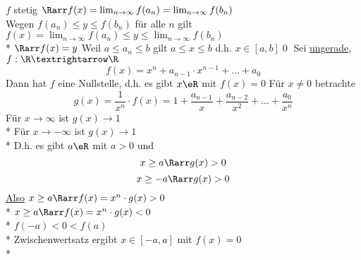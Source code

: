 	$f$ stetig $\Rarr f(x) = \lim_{n \to \infty} f(a_n) = \lim_{n \to \infty} f(b_n)$\\
	Wegen $f(a_n) \leq y \leq f(b_n)$ für alle $n$ gilt $f(x) = \lim_{n \to \infty} f(a_n) \leq y \leq \lim_{n \to \infty} f(b_n)$\\*
	$\Rarr f(x) = y$ 
%
\bem
Weil $a\leq a_n\leq b$ gilt $a\leq x\leq b$ d.h. $x\in[a,b]$\qed
{}
Sei \nN{} \ul{ungerade}, $f:\R→\R$
$$f(x)=x^n+a_{n-1}·x^{n-1}+…+a_0$$
Dann hat $f$ eine Nullstelle, d.h. es gibt $x\eR$ mit $f(x)=0$
\bew
Für $x\neq 0$ betrachte
$$g(x)=\frac{1}{x^n} \cdot f(x)=1+\frac{a_{n-1}}{x}+\frac{a_{n-2}}{x^2}+…+\frac{a_0}{x^n}$$
Für $x→∞$ ist $g(x)→1$\\*
Für $x→-∞$ ist $g(x)→1$\\*
D.h. es gibt $a\eR$ mit $a>0$ und
$$x\geq a \Rarr g(x)>0$$
$$x\geq -a \Rarr g(x)>0$$
%
\ul{Also} $x \geq a \Rarr f(x) = x^n \cdot g(x) > 0$\\*
	$x \geq a \Rarr f(x) = x^n \cdot g(x) < 0$\\* %
	$f(-a) < 0 < f(a)$\\*
	Zwischenwertsatz \Rarr ergibt $x \in [-a, a]$ mit $f(x) = 0$\\*

